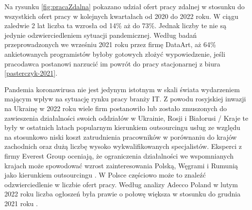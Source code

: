 Na rysunku \ref{fig:pracaZdalna} pokazano udział ofert pracy zdalnej w stosunku do wszystkich ofert pracy w kolejnych kwartałach od 2020 do 2022 roku.
W ciągu zaledwie 2 lat liczba ta wzrosła od 14\% aż do 73\%.
Jednak liczby te nie są jedynie odzwierciedleniem sytuacji pandemicznej. Według badań przeprowadzonych we wrześniu 2021 roku przez firmę DataArt, aż 64\% ankietowanych programistów byłoby gotowych złożyć wypowiedzenie, jeśli pracodawca postanowi narzucić im powrót do pracy stacjonarnej z biura \ref{pasterczyk-2021}.



Pandemia koronawirusa nie jest jedynym istotnym w skali świata wydarzeniem mającym wpływ na sytuację rynku pracy branży IT.
Z powodu rosyjskiej inwazji na Ukrainę w 2022 roku wiele firm postanowiło lub zostało zmuszonych do zawieszenia działalności swoich oddziałów w Ukrainie, Rosji i Białorusi \cite{blaszczak-2022}/
Kraje te były w ostatnich latach popularnym kierunkiem outsourcingu usług ze względu na stosunkowo niski koszt zatrudnienia pracowników w porównaniu do krajów zachodnich oraz dużą liczbę wysoko wykwalifikowanych specjalistów.
Eksperci z firmy Everest Group oceniają, że ograniczenia działalności we wspomnianych krajach może spowodować wzrost zainteresowania Polską, Węgrami i Rumunią jako kierunkiem outsourcingu \cite{overby-2022}.
W Polsce częściowo może to znaleźć odzwierciedlenie w liczbie ofert pracy. Według analizy Adecco Poland w lutym 2022 roku liczba ogłoszeń była prawie o połowę większa w stosunku do grudnia 2021 roku \cite{blaszczak-2022}.

\thispagestyle{normal}
